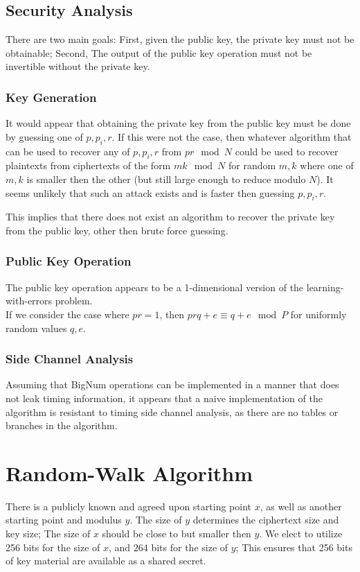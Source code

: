\documentclass[preprint]{iacrtrans}
\begin{document}
\subsection{Security Analysis}
There are two main goals: First, given the public key, the private key must not be obtainable; Second, The output of the public key operation must not be invertible without the private key.

\subsubsection{Key Generation}
It would appear that obtaining the private key from the public key must be done by guessing one of $p, p_i, r$. If this were not the case, then whatever algorithm that can be used to recover any of $p, p_i, r$ from $p r \mod N$ could be used to recover plaintexts from ciphertexts of the form $m k \mod N$ for random $m, k$ where one of $m, k$ is smaller then the other (but still large enough to reduce modulo $N$). It seems unlikely that such an attack exists and is faster then guessing $p, p_i,  r$. 

This implies that there does not exist an algorithm to recover the private key from the public key, other then brute force guessing.

\subsubsection{Public Key Operation}
The public key operation appears to be a 1-dimensional version of the learning-with-errors problem.\\

If we consider the case where $pr = 1$, then $prq + e \equiv q + e \mod P$ for uniformly random values $q, e$. 

\subsubsection{Side Channel Analysis}
Assuming that BigNum operations can be implemented in a manner that does not leak timing information, it appears that a naive implementation of the algorithm is resistant to timing side channel analysis, as there are no tables or branches in the algorithm.

\section{Random-Walk Algorithm}
There is a publicly known and agreed upon starting point $x$, as well as another starting point and modulus $y$. The size of $y$ determines the ciphertext size and key size; The size of $x$ should be close to but smaller then $y$. We elect to utilize 256 bits for the size of $x$, and $264$ bits for the size of $y$; This ensures that 256 bits of key material are available as a shared secret.
\end{document}
